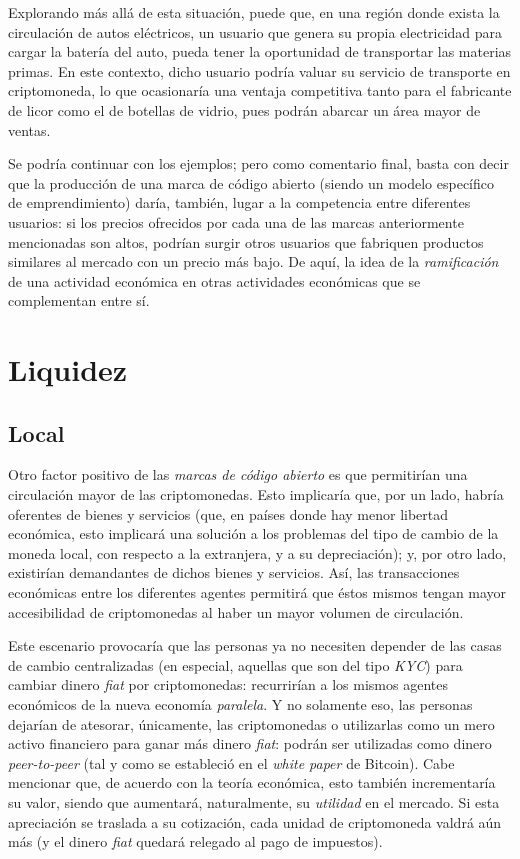 \documentclass[12pt,a4paper]{article}
\begin{document}
Explorando más allá de esta situación, puede que, en una región donde exista la circulación de autos eléctricos, un usuario que genera su propia electricidad para cargar la batería del auto, pueda tener la oportunidad de transportar las materias primas. En este contexto, dicho usuario podría valuar su servicio de transporte en criptomoneda, lo que ocasionaría una ventaja competitiva tanto para el fabricante de licor como el de botellas de vidrio, pues podrán abarcar un área mayor de ventas.

Se podría continuar con los ejemplos; pero como comentario final, basta con decir que la producción de una marca de código abierto (siendo un modelo específico de emprendimiento) daría, también, lugar a la competencia entre diferentes usuarios: si los precios ofrecidos por cada una de las marcas anteriormente mencionadas son altos, podrían surgir otros usuarios que fabriquen productos similares al mercado con un precio más bajo. De aquí, la idea de la \textit{ramificación} de una actividad económica en otras actividades económicas que se complementan entre sí.

\section{Liquidez}
\subsection{Local}
Otro factor positivo de las \textit{marcas de código abierto} es que permitirían una circulación mayor de las criptomonedas. Esto implicaría que, por un lado, habría oferentes de bienes y servicios (que, en países donde hay menor libertad económica, esto implicará una solución a los problemas del tipo de cambio de la moneda local, con respecto a la extranjera, y a su depreciación); y, por otro lado, existirían demandantes de dichos bienes y servicios. Así, las transacciones económicas entre los diferentes agentes permitirá que éstos mismos tengan mayor accesibilidad de criptomonedas al haber un mayor volumen de circulación.

Este escenario provocaría que las personas ya no necesiten depender de las casas de cambio centralizadas (en especial, aquellas que son del tipo \textit{KYC}) para cambiar dinero \textit{fiat} por criptomonedas: recurrirían a los mismos agentes económicos de la nueva economía \textit{paralela}. Y no solamente eso, las personas dejarían de atesorar, únicamente, las criptomonedas o utilizarlas como un mero activo financiero para ganar más dinero \textit{fiat}: podrán ser utilizadas como dinero \textit{peer-to-peer} (tal y como se estableció en el \textit{white paper} de Bitcoin). Cabe mencionar que, de acuerdo con la teoría económica, esto también incrementaría su valor, siendo que aumentará, naturalmente, su \textit{utilidad} en el mercado. Si esta apreciación se traslada a su cotización, cada unidad de criptomoneda valdrá aún más (y el dinero \textit{fiat} quedará relegado al pago de impuestos).
\end{document}
